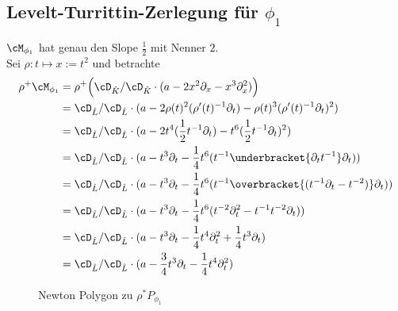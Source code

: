 \subsection{Levelt-Turrittin-Zerlegung für $\phi_1$}
\begin{comment}
Zeige zunächst: ist noch nicht zerlegt!\\
Es ist $\cM_{\phi_1}\bydef \cD_{\hat K}/\cD_{\hat K}\cdot P_{}\phi_1}$. Wäre
dieser bereits Zerlegt, also gleich einem Elementarem Meromorphen Zusammenhang,
so müsste es $\rho\in t\Cft$, $\phi\in\hat L$ und $R$ geben, so dass
$\cM_{\phi_1}\cong El(\rho,\phi,R)=\rho_+(\sE^\phi\otimes R)$.
\end{comment}
\begin{comment}
vergleiche mit \cite[Proof of theorem 5.4.7]{sabbah_cimpa90}\\
was ist $\sigma_L(P)\in \hat K[\xi]$?
\end{comment}
$\cM_{\phi_1}$ hat genau den Slope $\frac{1}{2}$ mit Nenner $2$.\\
Sei $\rho:t\mapsto x:=t^2$ und betrachte
\begin{align*}
\rho^+\cM_{\phi_1} &= \rho^+\Big( \cD_{\hat K}/\cD_{\hat
  K}\cdot(a-2x^2\partial_x -x^3\partial_x^2) \Big) \\
&= \cD_{\hat L}/\cD_{\hat L}\cdot(a-2\rho(t)^2(\rho'(t)^{-1}\partial_t)
  -\rho(t)^3(\rho'(t)^{-1}\partial_t)^2)\\
&= \cD_{\hat L}/\cD_{\hat L}\cdot(a-2t^4(\frac{1}{2}t^{-1}\partial_t)
  -t^6(\frac{1}{2}t^{-1}\partial_t)^2)\\
&= \cD_{\hat L}/\cD_{\hat L}\cdot(a-t^3\partial_t
  -\frac{1}{4}t^6(t^{-1}\underbracket{\partial_tt^{-1}}\partial_t))\\
&= \cD_{\hat L}/\cD_{\hat L}\cdot(a-t^3\partial_t
  -\frac{1}{4}t^6(t^{-1}\overbracket{(t^{-1}\partial_t -t^{-2})}\partial_t))\\
&= \cD_{\hat L}/\cD_{\hat L}\cdot(a-t^3\partial_t
  -\frac{1}{4}t^6(t^{-2}\partial_t^2 -t^{-1}t^{-2}\partial_t))\\
&= \cD_{\hat L}/\cD_{\hat L}\cdot(a-t^3\partial_t
  -\frac{1}{4}t^4\partial_t^2+\frac{1}{4}t^{3}\partial_t)\\
&= \cD_{\hat L}/\cD_{\hat L}\cdot(a-\frac{3}{4}t^3\partial_t
  -\frac{1}{4}t^4\partial_t^2)\\
\end{align*}
\begin{figure}[H]
\caption{Newton Polygon zu $\rho^*P_{\phi_1}$}
\begin{center}
\end{center}
\end{figure}
